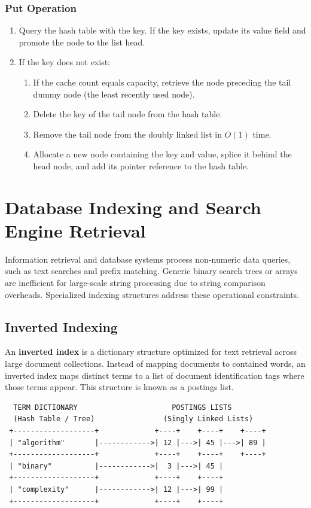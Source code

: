\documentclass[12pt]{report}
\begin{document}
\subsubsection{Put Operation}
\begin{enumerate}
    \item Query the hash table with the key. If the key exists, update its value field and promote the node to the list head.
    \item If the key does not exist:
    \begin{enumerate}
        \item If the cache count equals capacity, retrieve the node preceding the tail dummy node (the least recently used node).
        \item Delete the key of the tail node from the hash table.
        \item Remove the tail node from the doubly linked list in $O(1)$ time.
        \item Allocate a new node containing the key and value, splice it behind the head node, and add its pointer reference to the hash table.
    \end{enumerate}
\end{enumerate}

\section{Database Indexing and Search Engine Retrieval}

Information retrieval and database systems process non-numeric data queries, such as text searches and prefix matching. Generic binary search trees or arrays are inefficient for large-scale string processing due to string comparison overheads. Specialized indexing structures address these operational constraints.

\subsection{Inverted Indexing}

An \textbf{inverted index} is a dictionary structure optimized for text retrieval across large document collections. Instead of mapping documents to contained words, an inverted index maps distinct terms to a list of document identification tags where those terms appear. This structure is known as a postings list.

\begin{verbatim}
  TERM DICTIONARY                      POSTINGS LISTS
  (Hash Table / Tree)                (Singly Linked Lists)
 +-------------------+             +----+    +----+    +----+
 | "algorithm"       |------------>| 12 |--->| 45 |--->| 89 |
 +-------------------+             +----+    +----+    +----+
 | "binary"          |------------>|  3 |--->| 45 |
 +-------------------+             +----+    +----+
 | "complexity"      |------------>| 12 |--->| 99 |
 +-------------------+             +----+    +----+
\end{verbatim}
\end{document}
